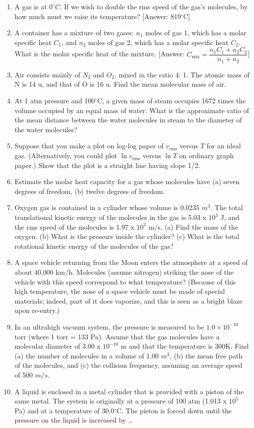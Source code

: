 \documentclass{article}
\renewcommand{\frac}[2]{\dfrac{#1}{#2}}
\begin{document}
\begin{enumerate}
      [Answer: (a) 6.80 m/s, (b) 7.41 m/s, (c) 7 m/s]
      \item A gas is at \( 0^\circ C \). If we wish to double the rms speed of the gas's molecules, by how much must we raise its temperature?
      [Answer: 819\(^{\circ}\)C]
      \item A container has a mixture of two gases: \( n_1 \) moles of gas 1, which has a molar specific heat \( C_1 \), and \( n_2 \) moles of gas 2, which has a molar specific heat \( C_2 \). What is the molar specific heat of the mixture. [Answer: \( C_{\text{mix}} = \frac{n_1 C_1 + n_2 C_2}{n_1 + n_2} \)]
      \item Air consists mainly of \( N_2 \) and \( O_2 \), mixed in the ratio 4: 1. The atomic mass of N is 14 u, and that of O is 16 u. Find the mean molecular mass of air.
      \item At 1 atm pressure and 100\(^{\circ}\)C, a given mass of steam occupies 1672 times the volume occupied by an equal mass of water. What is the approximate ratio of the mean distance between the water molecules in steam to the diameter of the water molecules?
      \item Suppose that you make a plot on log-log paper of \( v_{\text{rms}} \) versus \( T \) for an ideal gas. (Alternatively, you could plot \( \ln v_{\text{rms}} \) versus \( \ln T \) on ordinary graph paper.) Show that the plot is a straight line having slope 1/2.
      \item Estimate the molar heat capacity for a gas whose molecules have (a) seven degrees of freedom, (b) twelve degrees of freedom.
      \item Oxygen gas is contained in a cylinder whose volume is 0.0235 \( m^3 \). The total translational kinetic energy of the molecules in the gas is 5.03 x \( 10^3 \) J, and the rms speed of the molecules is 1.97 x \( 10^3 \) m/s. (a) Find the mass of the oxygen. (b) What is the pressure inside the cylinder? (c) What is the total rotational kinetic energy of the molecules of the gas?
      \item A space vehicle returning from the Moon enters the atmosphere at a speed of about 40,000 km/h. Molecules (assume nitrogen) striking the nose of the vehicle with this speed correspond to what temperature? (Because of this high temperature, the nose of a space vehicle must be made of special materials; indeed, part of it does vaporize, and this is seen as a bright blaze upon re-entry.)
      \item In an ultrahigh vacuum system, the pressure is measured to be \( 1.0 \times 10^{-10} \) torr (where 1 torr = 133 Pa). Assume that the gas molecules have a molecular diameter of 3.00 x \( 10^{-10} \) m and that the temperature is 300K. Find (a) the number of molecules in a volume of 1.00 \( m^3 \), (b) the mean free path of the molecules, and (c) the collision frequency, assuming an average speed of 500 \( m/s \).
      \item A liquid is enclosed in a metal cylinder that is provided with a piston of the same metal. The system is originally at a pressure of 100 atm (1.013 x \( 10^5 \) Pa) and at a temperature of 30.0\(^{\circ}\)C. The piston is forced down until the pressure on the liquid is increased by \ldots
    \end{enumerate}
\end{document}
